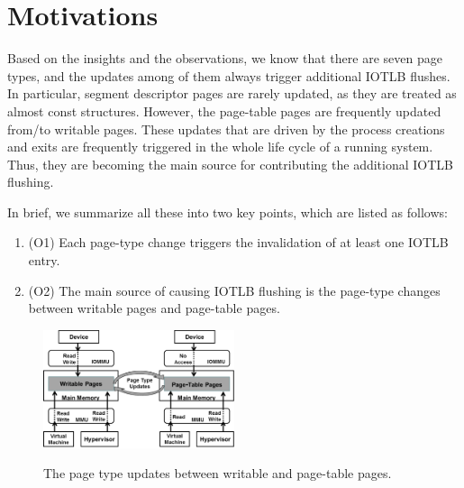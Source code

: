 \section{Motivations} \label{sec:moti}
Based on the insights and the observations, we know that there are seven page types, and the updates among of them always trigger additional IOTLB flushes. 
In particular, segment descriptor pages are rarely updated, as they are treated as almost const structures.  
However, the page-table pages are frequently updated from/to writable pages. 
These updates that are driven by the process creations and exits are frequently triggered in the whole life cycle of a running system.
Thus, they are becoming the main source for contributing the additional IOTLB flushing.

In brief, we summarize all these into two key points, which are listed as follows:
\begin{enumerate}
\item (O1) Each page-type change triggers the invalidation of at least one IOTLB entry.
\item (O2) The main source of causing IOTLB flushing is the page-type changes between writable pages and page-table pages.
\end{enumerate}

\begin{figure}[ht]
\centering
\includegraphics[width=0.5\textwidth]{image/background/wr2pt.png} \\
\caption{The page type updates between writable and page-table pages.}
\label{fig:wr2pt}
\end{figure}

